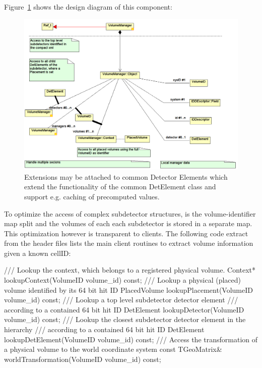 \documentclass[10pt,a4paper]{article}
\begin{document}
\noindent
Figure~\ref{fig:dd4hep-user-manual-volmgr} shows the design diagram of this component:
\begin{figure}[h]
  \begin{center}
    \includegraphics[width=170mm] {DD4hep-volmgr}
    \caption{Extensions may be attached to common Detector Elements which 
             extend the functionality of the common DetElement 
             class and support e.g. caching of precomputed values.}
    \label{fig:dd4hep-user-manual-volmgr}
  \end{center}
\end{figure}

\noindent
To optimize the access of complex subdetector structures, is the volume-identifier
map split and the volumes of each each subdetector is stored in a separate map.
This optimization however is transparent to clients. The following code extract
from the header files lists the main client routines to extract volume information
given a known cellID:
\begin{code}
  /// Lookup the context, which belongs to a registered physical volume.
  Context* lookupContext(VolumeID volume_id) const;
  /// Lookup a physical (placed) volume identified by its 64 bit hit ID
  PlacedVolume lookupPlacement(VolumeID volume_id) const;
  /// Lookup a top level subdetector detector element 
  /// according to a contained 64 bit hit ID
  DetElement lookupDetector(VolumeID volume_id) const;
  /// Lookup the closest subdetector detector element in the hierarchy 
  /// according to a contained 64 bit hit ID
  DetElement lookupDetElement(VolumeID volume_id) const;
  /// Access the transformation of a physical volume to the world coordinate system
  const TGeoMatrix& worldTransformation(VolumeID volume_id) const;
\end{code}
\end{document}
